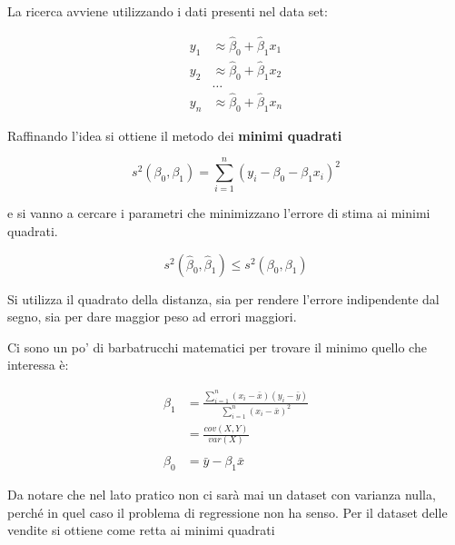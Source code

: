  La ricerca avviene utilizzando i dati presenti nel data set:


\begin{align*}
	y_1 &\approx \hat{\beta}_0 + \hat{\beta}_1 x_1 \\
	y_2 &\approx \hat{\beta}_0 + \hat{\beta}_1 x_2 \\
	&\ldots \\
	y_n &\approx \hat{\beta}_0 + \hat{\beta}_1 x_n
\end{align*}

Raffinando l'idea si ottiene il metodo dei \textbf{minimi quadrati}

$$
s^2(\beta_0, \beta_1) = \sum\limits_{i=1}^n(y_i - \beta_0 - \beta_1 x_i)^2
$$

e si vanno a cercare i parametri che minimizzano l'errore di stima
ai minimi quadrati.

$$ s^2(\hat{\beta}_0,\hat{\beta}_1) \leq s^2(\beta_0, \beta_1) $$

Si utilizza il quadrato della distanza, sia per rendere l'errore
indipendente dal segno, sia per dare maggior peso ad errori maggiori.

Ci sono un po' di barbatrucchi matematici per trovare il minimo quello
che interessa è:

\begin{align*}
	\beta_1 &= \frac{\sum\limits_{i=1}^{n} (x_i - \bar{x})(y_i - \bar{y})}{ \sum\limits_{i=1}^{n} (x_i - \bar{x})^2} \\
	 &= \frac{cov(X,Y)}{var(X)} \\
	 \: \\
	\beta_0 &= \bar{y} - \beta_1 \bar{x}
\end{align*}

Da notare che nel lato pratico non ci sarà mai un dataset con varianza
nulla, perché in quel caso il problema di regressione non ha senso. Per
il dataset delle vendite si ottiene come retta ai minimi quadrati

